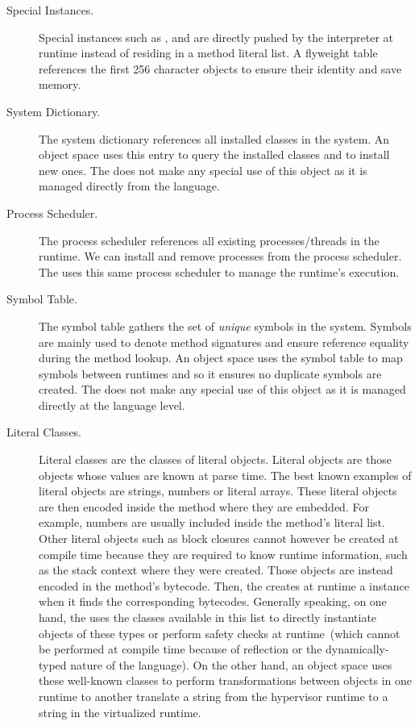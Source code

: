 \begin{description}
\item[Special Instances.] Special instances such as ,  and  are directly pushed by the \VM interpreter at runtime instead of residing in a method literal list. A flyweight  table references the first 256 character objects to ensure their identity and save memory.

\item[System Dictionary.] The system dictionary references all installed classes in the system. An object space uses this entry to query the installed classes and to install new ones. The \VM does not make any special use of this object as it is managed directly from the language.

\item[Process Scheduler.] The process scheduler references all existing processes/threads in the runtime. We can install and remove processes from the process scheduler. The \VM uses this same process scheduler to manage the runtime's execution.

\item[Symbol Table.] The symbol table gathers the set of \emph{unique} symbols in the system. Symbols are mainly used to denote method signatures and ensure reference equality during the method lookup. An object space uses the symbol table to map symbols between runtimes and so it ensures no duplicate symbols are created. The \VM does not make any special use of this object as it is managed directly at the language level.

\item[Literal Classes.] Literal classes are the classes of literal objects. Literal objects are those objects whose values are known at parse time. The best known examples of literal objects are strings, numbers or literal arrays. These literal objects are then encoded inside the method where they are embedded. For example, numbers are usually included inside the method's literal list. Other literal objects such as block closures cannot however be created at compile time because they are required to know runtime information, such as the stack context where they were created. Those objects are instead encoded in the method's bytecode. Then, the \VM creates at runtime a  instance when it finds the corresponding bytecodes. Generally speaking, on one hand, the \VM uses the classes available in this list to directly instantiate objects of these types or perform safety checks at runtime~(which cannot be performed at compile time because of reflection or the dynamically-typed nature of the language). On the other hand, an object space uses these well-known classes to perform transformations between objects in one runtime to another \eg translate a string from the hypervisor runtime to a string in the virtualized runtime.


\end{description}
